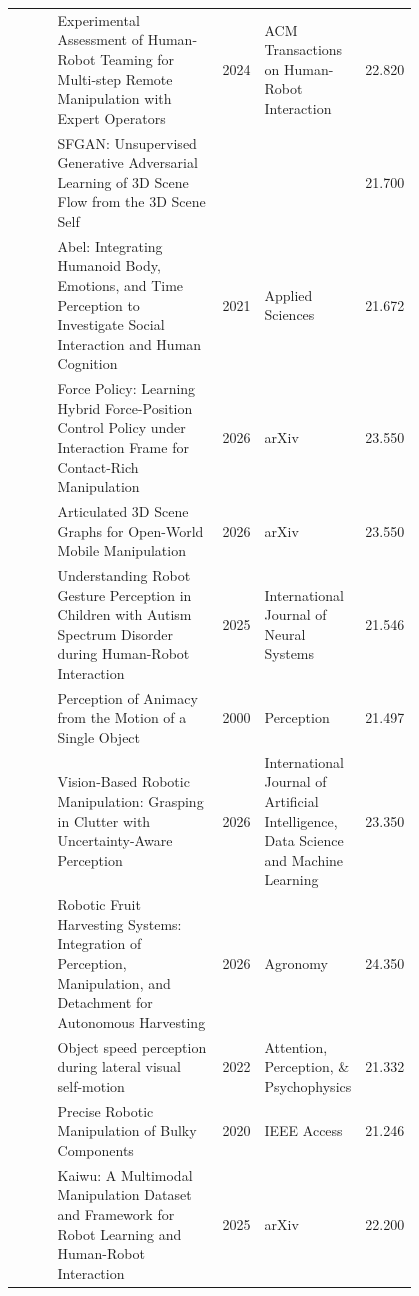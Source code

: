 \documentclass{article}
\begin{document}
\begin{center}
\begin{longtable}{p{0.12\linewidth}p{0.44\linewidth}cp{0.24\linewidth}c}
\citep{pool84_25} & Experimental Assessment of Human-Robot Teaming for Multi-step Remote Manipulation with Expert Operators & 2024 & ACM Transactions on Human-Robot Interaction & 22.820\\
\citep{pool84_26} & SFGAN: Unsupervised Generative Adversarial Learning of 3D Scene Flow from the 3D Scene Self &  &  & 21.700\\
\citep{pool84_27} & Abel: Integrating Humanoid Body, Emotions, and Time Perception to Investigate Social Interaction and Human Cognition & 2021 & Applied Sciences & 21.672\\
\citep{pool84_28} & Force Policy: Learning Hybrid Force-Position Control Policy under Interaction Frame for Contact-Rich Manipulation & 2026 & arXiv & 23.550\\
\citep{pool84_29} & Articulated 3D Scene Graphs for Open-World Mobile Manipulation & 2026 & arXiv & 23.550\\
\citep{pool84_30} & Understanding Robot Gesture Perception in Children with Autism Spectrum Disorder during Human-Robot Interaction & 2025 & International Journal of Neural Systems & 21.546\\
\citep{pool84_31} & Perception of Animacy from the Motion of a Single Object & 2000 & Perception & 21.497\\
\citep{pool84_32} & Vision-Based Robotic Manipulation: Grasping in Clutter with Uncertainty-Aware Perception & 2026 & International Journal of Artificial Intelligence, Data Science and Machine Learning & 23.350\\
\citep{pool84_33} & Robotic Fruit Harvesting Systems: Integration of Perception, Manipulation, and Detachment for Autonomous Harvesting & 2026 & Agronomy & 24.350\\
\citep{pool84_34} & Object speed perception during lateral visual self-motion & 2022 & Attention, Perception, \& Psychophysics & 21.332\\
\citep{pool84_35} & Precise Robotic Manipulation of Bulky Components & 2020 & IEEE Access & 21.246\\
\citep{pool84_36} & Kaiwu: A Multimodal Manipulation Dataset and Framework for Robot Learning and Human-Robot Interaction & 2025 & arXiv & 22.200\\
\bottomrule
\end{longtable}
\normalsize
\end{center}




\end{document}
